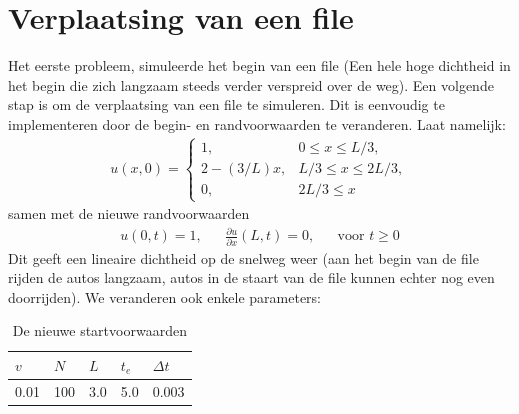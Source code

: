 \documentclass{article}
\newcommand{\Dt}{\Delta t}
\begin{document}
\section*{Verplaatsing van een file}
Het eerste probleem, simuleerde het begin van een file (Een hele hoge dichtheid in het begin die zich langzaam steeds verder verspreid over de weg). 
Een volgende stap is om de verplaatsing van een file te simuleren. 
Dit is eenvoudig te implementeren door de begin- en randvoorwaarden te veranderen.
Laat namelijk:
\begin{align*}
	u(x,0) =\begin{cases}
	1, & 0\leq x \leq L/3,\\
	2-(3/L)x, & L/3 \leq x\leq 2L/3,\\
	0, & 2L/3 \leq x
	\end{cases}
\end{align*}
samen met de nieuwe randvoorwaarden 
\begin{align*}
u(0,t)=1,&&\frac{\partial u}{\partial x}(L,t)=0,&&\mbox{voor }t\geq 0
\end{align*}
Dit geeft een lineaire dichtheid op de snelweg weer (aan het begin van de file rijden de autos langzaam, autos in de staart van de file kunnen echter nog even doorrijden).
We veranderen ook enkele parameters:
\begin{table}[H]
\centering
\label{tab:specs2}
\begin{tabular}{|l|l|l|l|l|}
\hline
\(v\) & \(N\) & \(L\) & \(t_e\) & \(\Dt\) \\ \hline
 0.01 & 100 & 3.0 & 5.0 & 0.003 \\ \hline
\end{tabular}
\caption{De nieuwe startvoorwaarden}
\end{table}
\end{document}
